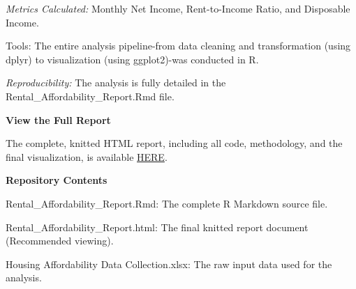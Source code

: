 \documentclass[
]{article}
\begin{document}
\emph{Metrics Calculated:} Monthly Net Income, Rent-to-Income Ratio, and
Disposable Income.

Tools: The entire analysis pipeline-from data cleaning and
transformation (using dplyr) to visualization (using ggplot2)-was
conducted in R.

\emph{Reproducibility:} The analysis is fully detailed in the
Rental\_Affordability\_Report.Rmd file.

\textbf{View the Full Report}

The complete, knitted HTML report, including all code, methodology, and
the final visualization, is available
\href{https://github.com/FatyaB/housing-affordability-analysis/blob/main/rent_affordability.html}{HERE}.

\textbf{Repository Contents}

Rental\_Affordability\_Report.Rmd: The complete R Markdown source file.

Rental\_Affordability\_Report.html: The final knitted report document
(Recommended viewing).

Housing Affordability Data Collection.xlsx: The raw input data used for
the analysis.
\end{document}
